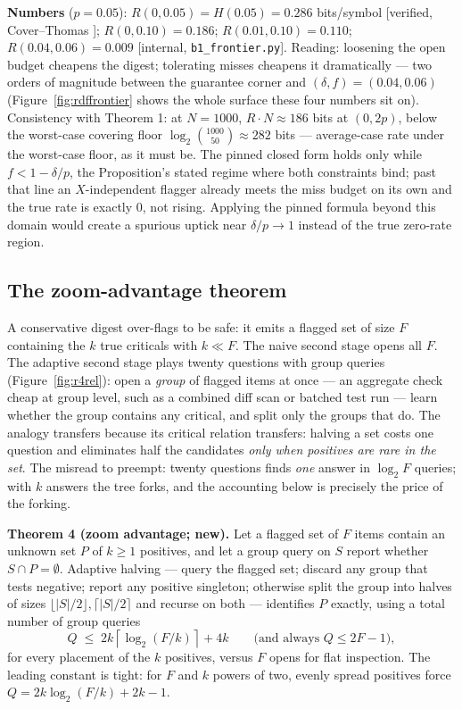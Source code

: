 \documentclass[11pt,a4paper]{article}
\begin{document}
\textbf{Numbers} ($p=0.05$): $R(0,0.05)=H(0.05)=0.286$ bits/symbol [verified, Cover--Thomas \cite{coverthomas}]; $R(0,0.10)=0.186$; $R(0.01,0.10)=0.110$; $R(0.04,0.06)=0.009$ [internal, \texttt{b1\_frontier.py}]. Reading: loosening the open budget cheapens the digest; tolerating misses cheapens it dramatically --- two orders of magnitude between the guarantee corner and $(\delta,f)=(0.04,0.06)$ (Figure~\ref{fig:rdffrontier} shows the whole surface these four numbers sit on). Consistency with Theorem 1: at $N{=}1000$, $R\cdot N\approx 186$ bits at $(0,2p)$, below the worst-case covering floor $\log_2\binom{1000}{50}\approx 282$ bits --- average-case rate under the worst-case floor, as it must be. The pinned closed form holds only while $f<1-\delta/p$, the Proposition's stated regime where both constraints bind; past that line an $X$-independent flagger already meets the miss budget on its own and the true rate is exactly $0$, not rising. Applying the pinned formula beyond this domain would create a spurious uptick near $\delta/p\to1$ instead of the true zero-rate region.



\subsection{The zoom-advantage theorem}\label{sec:zoom}
A conservative digest over-flags to be safe: it emits a flagged set of size $F$ containing the $k$ true criticals with $k\ll F$. The naive second stage opens all $F$. The adaptive second stage plays twenty questions with group queries (Figure~\ref{fig:r4rel}): open a \emph{group} of flagged items at once --- an aggregate check cheap at group level, such as a combined diff scan or batched test run --- learn whether the group contains any critical, and split only the groups that do. The analogy transfers because its critical relation transfers: halving a set costs one question and eliminates half the candidates \emph{only when positives are rare in the set}. The misread to preempt: twenty questions finds \emph{one} answer in $\log_2 F$ queries; with $k$ answers the tree forks, and the accounting below is precisely the price of the forking.

\begin{thebox}
\textbf{Theorem 4 (zoom advantage; new).} Let a flagged set of $F$ items contain an unknown set $P$ of $k\ge1$ positives, and let a group query on $S$ report whether $S\cap P=\emptyset$. Adaptive halving --- query the flagged set; discard any group that tests negative; report any positive singleton; otherwise split the group into halves of sizes $\lfloor|S|/2\rfloor,\lceil|S|/2\rceil$ and recurse on both --- identifies $P$ exactly, using a total number of group queries
\[
Q \;\le\; 2k\left\lceil\log_2(F/k)\right\rceil + 4k
\qquad\text{(and always } Q\le 2F-1\text{)},
\]
for every placement of the $k$ positives, versus $F$ opens for flat inspection. The leading constant is tight: for $F$ and $k$ powers of two, evenly spread positives force $Q=2k\log_2(F/k)+2k-1$.
\end{thebox}
\end{document}
